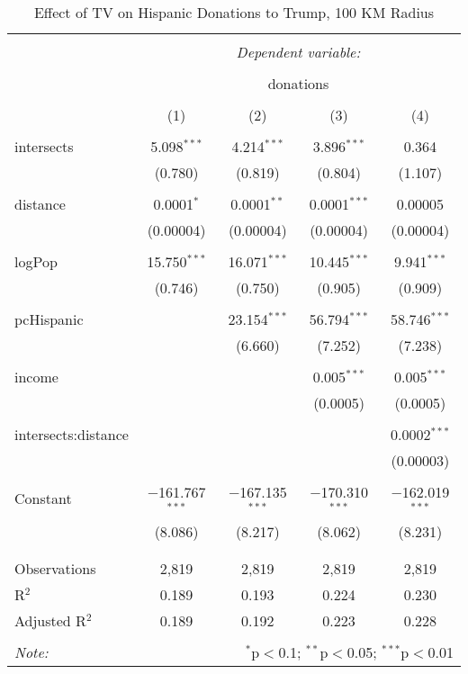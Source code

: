 
\begin{table}[!htbp] \centering 
  \caption{Effect of TV on Hispanic Donations to Trump, 100 KM Radius} 
  \label{} 
\begin{tabular}{@{\extracolsep{-5pt}}lcccc} 
\\[-1.8ex]\hline 
\hline \\[-1.8ex] 
 & \multicolumn{4}{c}{\textit{Dependent variable:}} \\ 
\cline{2-5} 
\\[-1.8ex] & \multicolumn{4}{c}{donations} \\ 
\\[-1.8ex] & (1) & (2) & (3) & (4)\\ 
\hline \\[-1.8ex] 
 intersects & 5.098$^{***}$ & 4.214$^{***}$ & 3.896$^{***}$ & 0.364 \\ 
  & (0.780) & (0.819) & (0.804) & (1.107) \\ 
  & & & & \\ 
 distance & 0.0001$^{*}$ & 0.0001$^{**}$ & 0.0001$^{***}$ & 0.00005 \\ 
  & (0.00004) & (0.00004) & (0.00004) & (0.00004) \\ 
  & & & & \\ 
 logPop & 15.750$^{***}$ & 16.071$^{***}$ & 10.445$^{***}$ & 9.941$^{***}$ \\ 
  & (0.746) & (0.750) & (0.905) & (0.909) \\ 
  & & & & \\ 
 pcHispanic &  & 23.154$^{***}$ & 56.794$^{***}$ & 58.746$^{***}$ \\ 
  &  & (6.660) & (7.252) & (7.238) \\ 
  & & & & \\ 
 income &  &  & 0.005$^{***}$ & 0.005$^{***}$ \\ 
  &  &  & (0.0005) & (0.0005) \\ 
  & & & & \\ 
 intersects:distance &  &  &  & 0.0002$^{***}$ \\ 
  &  &  &  & (0.00003) \\ 
  & & & & \\ 
 Constant & $-$161.767$^{***}$ & $-$167.135$^{***}$ & $-$170.310$^{***}$ & $-$162.019$^{***}$ \\ 
  & (8.086) & (8.217) & (8.062) & (8.231) \\ 
  & & & & \\ 
\hline \\[-1.8ex] 
Observations & 2,819 & 2,819 & 2,819 & 2,819 \\ 
R$^{2}$ & 0.189 & 0.193 & 0.224 & 0.230 \\ 
Adjusted R$^{2}$ & 0.189 & 0.192 & 0.223 & 0.228 \\ 
\hline 
\hline \\[-1.8ex] 
\textit{Note:}  & \multicolumn{4}{r}{$^{*}$p$<$0.1; $^{**}$p$<$0.05; $^{***}$p$<$0.01} \\ 
\end{tabular} 
\end{table} 
